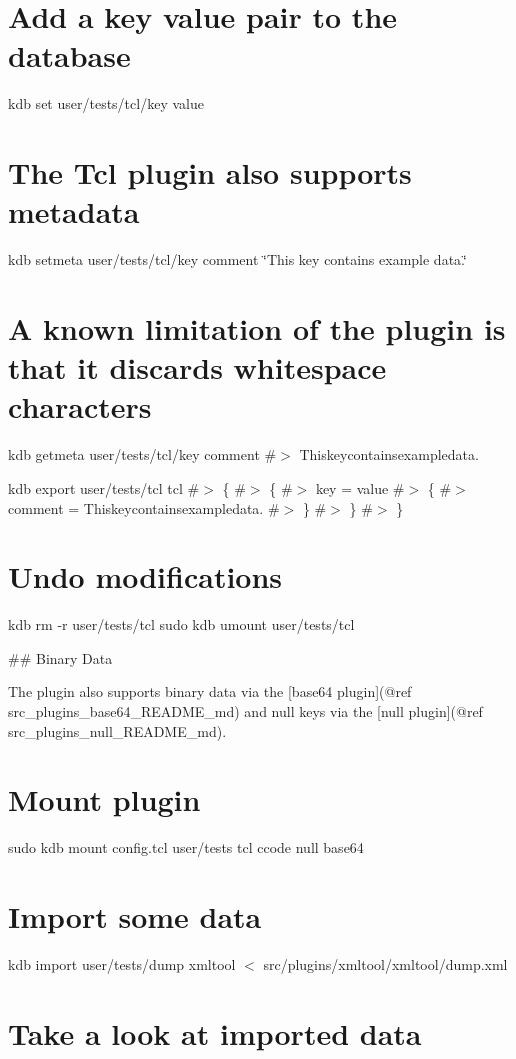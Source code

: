 \section*{Add a key value pair to the database}

kdb set user/tests/tcl/key value \section*{The Tcl plugin also supports metadata}

kdb setmeta user/tests/tcl/key comment \char`\"{}\+This key contains example data.\char`\"{} \section*{A known limitation of the plugin is that it discards whitespace characters}

kdb getmeta user/tests/tcl/key comment \#$>$ Thiskeycontainsexampledata.

kdb export user/tests/tcl tcl \#$>$ \{ \#$>$ \{ \#$>$ key = value \#$>$ \{ \#$>$ comment = Thiskeycontainsexampledata. \#$>$ \} \#$>$ \} \#$>$ \}

\section*{Undo modifications}

kdb rm -\/r user/tests/tcl sudo kdb umount user/tests/tcl 
\begin{DoxyCode}
## Binary Data

The plugin also supports binary data via the [base64 plugin](@ref src\_plugins\_base64\_README\_md) and null
       keys via the [null plugin](@ref src\_plugins\_null\_README\_md).
\end{DoxyCode}
 \section*{Mount plugin}

sudo kdb mount config.\+tcl user/tests tcl ccode null base64

\section*{Import some data}

kdb import user/tests/dump xmltool $<$ src/plugins/xmltool/xmltool/dump.\+xml

\section*{Take a look at imported data}

